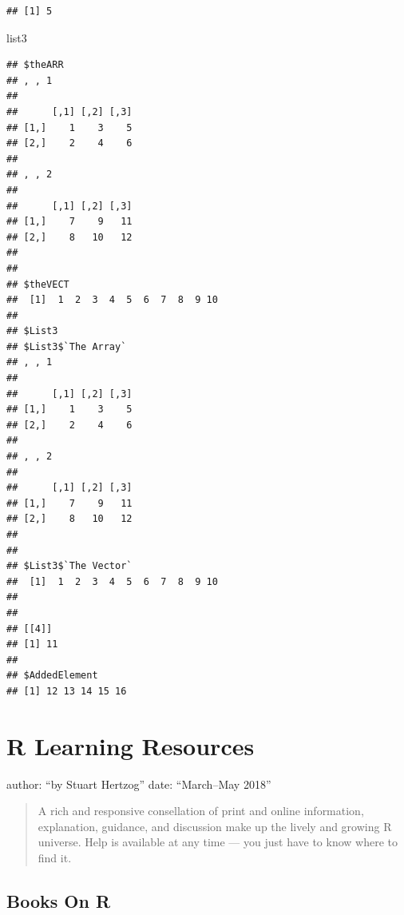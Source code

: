 \documentclass[]{book}
\newenvironment{Shaded}{\begin{snugshade}}{\end{snugshade}}
\newcommand{\NormalTok}[1]{#1}
\theoremstyle{definition}
\theoremstyle{definition}
\theoremstyle{definition}
\theoremstyle{remark}
\begin{document}
\begin{verbatim}
## [1] 5
\end{verbatim}

\begin{Shaded}
\begin{Highlighting}[]
\NormalTok{list3}
\end{Highlighting}
\end{Shaded}

\begin{verbatim}
## $theARR
## , , 1
## 
##      [,1] [,2] [,3]
## [1,]    1    3    5
## [2,]    2    4    6
## 
## , , 2
## 
##      [,1] [,2] [,3]
## [1,]    7    9   11
## [2,]    8   10   12
## 
## 
## $theVECT
##  [1]  1  2  3  4  5  6  7  8  9 10
## 
## $List3
## $List3$`The Array`
## , , 1
## 
##      [,1] [,2] [,3]
## [1,]    1    3    5
## [2,]    2    4    6
## 
## , , 2
## 
##      [,1] [,2] [,3]
## [1,]    7    9   11
## [2,]    8   10   12
## 
## 
## $List3$`The Vector`
##  [1]  1  2  3  4  5  6  7  8  9 10
## 
## 
## [[4]]
## [1] 11
## 
## $AddedElement
## [1] 12 13 14 15 16
\end{verbatim}

\hypertarget{r-learning-resources}{%
\chapter{R Learning Resources}\label{r-learning-resources}}

author: ``by Stuart Hertzog'' date: ``March--May 2018''

\begin{quote}
A rich and responsive consellation of print and online information,
explanation, guidance, and discussion make up the lively and growing R
universe. Help is available at any time --- you just have to know where
to find it.
\end{quote}

\hypertarget{books-on-r}{%
\section{Books On R}\label{books-on-r}}
\end{document}
